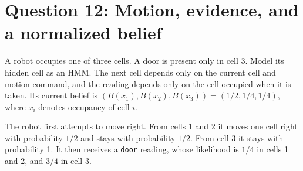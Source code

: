 \documentclass[11pt]{article}
\newcommand{\cellbelief}{B}            %
\begin{document}
\clearpage
\section*{Question 12: Motion, evidence, and a normalized belief}
A robot occupies one of three cells. A door is present only in cell 3.
Model its hidden cell as an HMM. The next cell depends only on the
current cell and motion command, and the reading depends only on the
cell occupied when it is taken.
Its current belief is
$(\cellbelief(x_1),\cellbelief(x_2),\cellbelief(x_3))=(1/2,1/4,1/4)$,
where $x_i$ denotes occupancy of cell $i$.
\begin{center}
\end{center}
The robot first attempts to move right. From cells 1 and 2 it moves
one cell right with probability $1/2$ and stays with probability $1/2$.
From cell 3 it stays with probability 1. It then receives a
\texttt{door} reading, whose likelihood is $1/4$ in cells 1 and 2,
and $3/4$ in cell 3.
\end{document}
